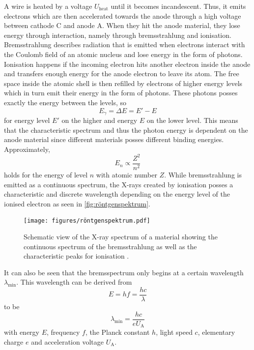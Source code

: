 A wire is heated by a voltage $U_\text{heat}$ until it becomes incandescent.
Thus, it emits electrons which are then accelerated towards the anode through a high voltage between cathode C and anode A.
When they hit the anode material, they lose energy through interaction, namely through bremsstrahlung and ionisation.
Bremsstrahlung describes radiation that is emitted when electrons interact with the Coulomb field of an atomic nucleus and lose energy in the form of photons.
Ionisation happens if the incoming electron hits another electron inside the anode and transfers enough energy for the anode electron to leave its atom.
The free space inside the atomic shell is then refilled by electrons of higher energy levels which in turn emit their energy in the form of photons.
These photons posses exactly the energy between the levels, so
\begin{equation*}
    E_\gamma = \Delta E = E' - E
\end{equation*}
for energy level $E'$ on the higher and energy $E$ on the lower level.
This means that the characteristic spectrum and thus the photon energy is dependent on the anode material since different materials posses different binding energies.
Approximately,
\begin{equation*}
    E_n \propto \frac{Z^2}{n^2}
\end{equation*}
holds for the energy of level $n$ with atomic number $Z$.
While bremsstrahlung is emitted as a continuous spectrum, the X-rays created by ionisation posses a characteristic and discrete wavelength depending
on the energy level of the ionised electron as seen in \autoref{fig:röntgenspektrum}.

\begin{figure}[H]
    \centering
    \texttt{[image: figures/röntgenspektrum.pdf]}
    \caption{Schematic view of the X-ray spectrum of a material showing the continuous spectrum of the bremsstrahlung as well as the characteristic peaks for ionisation \cite{röntgenspektrum}.}
    \label{fig:röntgenspektrum}
\end{figure}

It can also be seen that the bremsspectrum only begins at a certain wavelength $\lambda_\text{min}$.
This wavelength can be derived from
\begin{equation*}
    E = h f = \frac{h c}{\lambda}
\end{equation*}
to be
\begin{equation*}
    \lambda_\text{min} = \frac{h c}{e U_\text{A}}
\end{equation*}
with energy $E$, frequency $f$, the Planck constant $h$, light speed $c$, elementary charge $e$ and acceleration voltage $U_\text{A}$. \\

